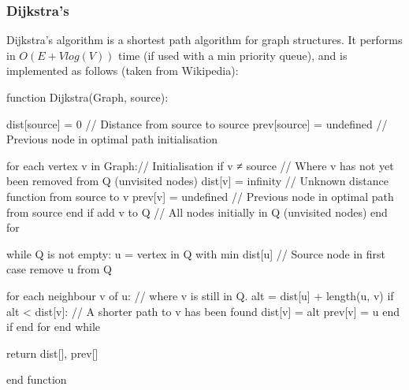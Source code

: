 \subsubsection{Dijkstra's}

Dijkstra's algorithm is a shortest path algorithm for graph structures. It
performs in $O(E + Vlog(V))$ time (if used with a min priority queue), and is
implemented as follows (taken from Wikipedia):

\begin{ccode}
  function Dijkstra(Graph, source):

    dist[source] = 0           // Distance from source to source
    prev[source] = undefined   // Previous node in optimal path initialisation

    for each vertex v in Graph:// Initialisation
      if v ≠ source            // Where v has not yet been removed from Q (unvisited nodes)
        dist[v] = infinity     // Unknown distance function from source to v
        prev[v] = undefined    // Previous node in optimal path from source
      end if 
      add v to Q               // All nodes initially in Q (unvisited nodes)
    end for
    
    while Q is not empty:
      u = vertex in Q with min dist[u]  // Source node in first case
      remove u from Q 
      
      for each neighbour v of u:         // where v is still in Q.
        alt = dist[u] + length(u, v)
        if alt < dist[v]:               // A shorter path to v has been found
          dist[v] = alt 
          prev[v] = u 
        end if
      end for
    end while

    return dist[], prev[]

  end function
\end{ccode}

